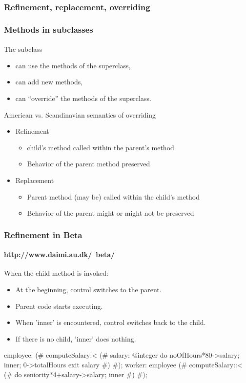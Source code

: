 \documentclass{beamer}
\begin{document}
\subsubsection{Refinement, replacement, overriding}
\begin{frame}[fragile]
\frametitle{Methods in subclasses}
\framesubtitle{}
The subclass
\begin{itemize}
\item can use  the methods of the superclass,
\item can add new methods,
\item can ``override'' the methods of the superclass.
\end{itemize}

\bigskip\pause

American vs. Scandinavian semantics of overriding
\begin{itemize}
\item Refinement
\begin{itemize}
\item child's method called within the parent's method
\item Behavior of the parent method preserved
\end{itemize}
\item Replacement
\begin{itemize}
\item Parent method (may be) called within the child's method
\item Behavior of the parent might or might not be preserved 
\end{itemize}
\end{itemize}
\end{frame}






\begin{frame}[fragile]
\frametitle{Refinement in Beta}
\framesubtitle{http://www.daimi.au.dk/~beta/}
When the child method is invoked:
\begin{itemize}
\item At the beginning, control switches to the parent.
\item Parent code starts executing.
\item When 'inner' is encountered, control switches
back to the child. 
\item If there is no child, 'inner' does nothing. 
\end{itemize}
\begin{java}
employee:
(# computeSalary:< 
     (# salary: @integer 
     do noOfHours*80->salary; inner; 0->totalHours  
     exit salary
     #)
#);
worker: employee
    (# computeSalary::< 
       (# do seniority*4+salary->salary; inner #)
 #);

\end{java}

\end{frame}
\end{document}
